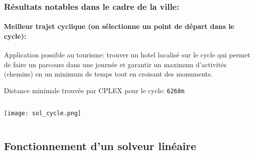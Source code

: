\documentclass[10pt]{beamer}
\begin{document}
\begin{frame}
\frametitle{Résultats notables dans le cadre de la ville:}
\framesubtitle{Meilleur trajet cyclique (on sélectionne un point de départ dans le cycle):}

Application possible au tourisme: trouver un hotel localisé sur le cycle qui permet de faire un parcours dans une journée et garantir un maximum d'activités (chemins) en un minimum de temps tout en croisant des monuments.

\vfill
Distance minimale trouvée par CPLEX  pour le cycle: \texttt{6268m}
  
\begin{columns}[T]
\begin{column}{0.30\textwidth}
\begin{center}
\texttt{[image: sol\_cycle.png]}
\end{center}
\end{column}
\end{columns}

\end{frame}

\subsection{Fonctionnement d'un solveur linéaire}
\end{document}
